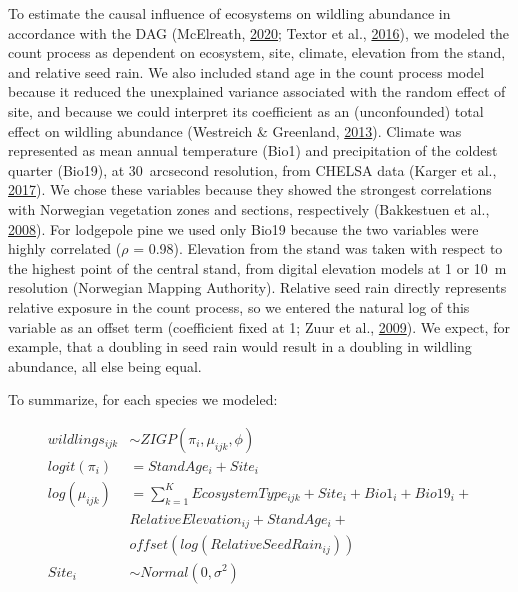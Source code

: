 \documentclass[
]{article}
\begin{document}
To estimate the causal influence of ecosystems on wildling abundance in accordance with the DAG (McElreath, \protect\hyperlink{ref-mcelreathHauntedDAGCausal2020}{2020}; Textor et al., \protect\hyperlink{ref-textorRobustCausalInference2016}{2016}), we modeled the count process as dependent on ecosystem, site, climate, elevation from the stand, and relative seed rain.
We also included stand age in the count process model because it reduced the unexplained variance associated with the random effect of site, and because we could interpret its coefficient as an (unconfounded) total effect on wildling abundance (Westreich \& Greenland, \protect\hyperlink{ref-westreichTableFallacyPresenting2013}{2013}).
Climate was represented as mean annual temperature (Bio1) and precipitation of the coldest quarter (Bio19), at 30~arcsecond resolution, from CHELSA data (Karger et al., \protect\hyperlink{ref-kargerClimatologiesHighResolution2017}{2017}).
We chose these variables because they showed the strongest correlations with Norwegian vegetation zones and sections, respectively (Bakkestuen et al., \protect\hyperlink{ref-bakkestuenSteplessModelsRegional2008}{2008}).
For lodgepole pine we used only Bio19 because the two variables were highly correlated (\(\rho\) = 0.98).
Elevation from the stand was taken with respect to the highest point of the central stand, from digital elevation models at 1 or 10~m resolution (Norwegian Mapping Authority).
Relative seed rain directly represents relative exposure in the count process, so we entered the natural log of this variable as an offset term (coefficient fixed at 1; Zuur et al., \protect\hyperlink{ref-zuurMixedEffectsModels2009}{2009}).
We expect, for example, that a doubling in seed rain would result in a doubling in wildling abundance, all else being equal.

To summarize, for each species we modeled:

\begin{equation}
\begin{aligned}
wildlings_{ijk} &\sim ZIGP(\pi_{i}, \mu_{ijk}, \phi) \\
logit(\pi_{i}) &= StandAge_{i} + Site_{i} \\
log(\mu_{ijk}) &= \sum\limits_{k=1}^K EcosystemType_{ijk} + Site_{i} + Bio1_{i} + Bio19_{i} + \\
&RelativeElevation_{ij} + StandAge_{i} + \\
&offset(log(RelativeSeedRain_{ij})) \\
Site_{i} &\sim Normal(0, \sigma^2) \\
\end{aligned}
\end{equation}
\end{document}
